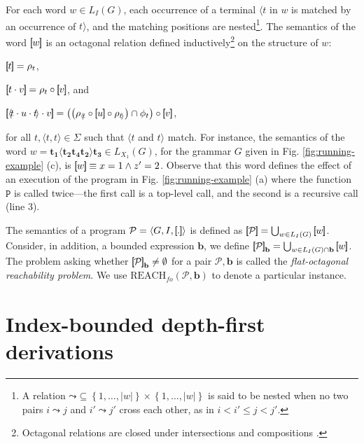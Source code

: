 \documentclass[final]{llncs}
\newcommand{\rbr}{{\bf ]\!\!]}}
\newcommand{\lbr}{{\bf [\!\![}}
\newcommand{\sem}[1]{\lbr #1 \rbr}
\def\set#1{{\left\{ #1 \right\}}}
\def\tuple#1{{\langle #1 \rangle}}
\def\len#1{{\vert{#1}\vert}}
\def\pat{{\mathbf{b}}}
\def\foreach{\mathrm{REACH}_{\mathit{fo}}}
\begin{document}
\smallskip
{} For each word \(w\in L_I(G)\), each occurrence of a
terminal \(\langle\!t\) in \(w\) is matched by an occurrence
of \(t\!\rangle\), and the matching positions are nested\footnote{A
relation \(\mathord{\leadsto} \subseteq \set{1,\ldots,\len{w}} \times \set{1,\ldots,\len{w}}\)
is said to be nested \cite{alur-jacm09} when no two pairs \(i \leadsto
j\) and \(i' \leadsto j'\) cross each other, as in \(i < i' \leq j <
j'\). }. The semantics of the word \(\sem{w}\) is an octagonal
relation defined inductively\footnote{Octagonal relations are closed under intersections and compositions \cite{mine}.} on the
structure of \(w\):
\begin{inparaenum}
\item \(\sem{t} = \rho_t\), 
\item \(\sem{t\cdot v} = \rho_t \circ \sem{v}\), and
\item \(\sem{\langle\!t \cdot u \cdot t\!\rangle \cdot v} = 
\left(\left(\rho_{\langle\!t} \circ \sem{u} \circ \rho_{t\!\rangle}\right) \cap \phi_t\right) \circ \sem{v}\),
\end{inparaenum}
for all \(t,\langle\!t,t\!\rangle \in \Sigma\) such that \(\langle\!t\) and \(t\!\rangle\) match. For instance, the
semantics of the word
\(w=\mathbf{t_1} \langle\!\mathbf{t_2} \mathbf{t_4} \mathbf{t_2}\!\rangle \mathbf{t_3} \in
L_{X_1}(G)\), for the grammar \(G\) given in Fig. \ref{fig:running-example} (c), is 
\(\sem{w} \equiv x=1 \wedge z'=2\). Observe that this word defines the effect of 
an execution of the program in Fig. \ref{fig:running-example} (a)
where the function \(\mathtt{P}\) is called twice---the first call is
a top-level call, and the second is a recursive call (line 3).

\smallskip
{}
The semantics of a program \(\mathcal{P} = \tuple{G,I,\sem{.}}\) is
defined as \(\sem{\mathcal{P}} = \bigcup_{w \in
L_I(G)} \sem{w}\). Consider, in addition, a bounded
expression \(\pat\), we
define \(\sem{\mathcal{P}}_\pat = \bigcup_{w \in
L_I(G) \cap \pat} \sem{w}\).  The problem asking
whether \(\sem{\mathcal{P}}_\pat \neq \emptyset\)
for a pair \(\mathcal{P},\pat\) is called
the \emph{flat-octagonal reachability problem}.
We use  \(\foreach(\mathcal{P}, \pat)\) to denote
a particular instance. 


\section{Index-bounded depth-first derivations}\label{sec:dfkderiv}
\end{document}
